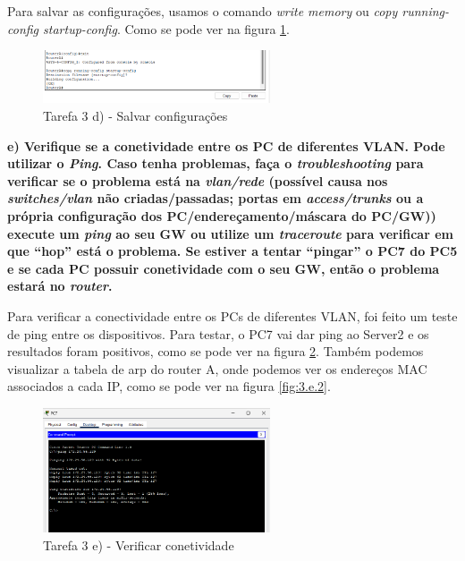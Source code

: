 \documentclass[11pt,english, openright, oneside]{book}
\begin{document}
Para salvar as configurações, usamos o comando \textit{write memory} ou \textit{copy running-config startup-config}. Como se pode ver na figura \ref{fig:3d}.
\vspace{0.2cm}

\begin{figure}[H]
    \centering
    \includegraphics[width=0.6\textwidth]{imagens/Tarefa3/3.d.png}
    \caption{Tarefa 3 d) - Salvar configurações}
    \label{fig:3d}
\end{figure}

\vspace{0.8cm}

\textbf{e) Verifique se a conetividade entre os PC de diferentes VLAN. Pode utilizar o \textit{Ping}. Caso tenha problemas, faça o \textit{troubleshooting} para verificar se o problema está na \textit{vlan/rede} (possível causa nos \textit{switches/vlan} não criadas/passadas; portas em \textit{access/trunks} ou a própria configuração dos PC/endereçamento/máscara do PC/GW)) execute um \textit{ping} ao seu GW ou utilize um \textit{traceroute} para verificar em que “hop” está o problema. Se estiver a tentar “pingar” o PC7 do PC5 e se cada PC possuir conetividade com o seu GW, então o problema estará no \textit{router}.}
\vspace{0.2cm}

Para verificar a conectividade entre os PCs de diferentes VLAN, foi feito um teste de ping entre os dispositivos. Para testar, o PC7 vai dar ping ao Server2 e os resultados foram positivos, como se pode ver na figura \ref{fig:3.e.1}. Também podemos visualizar a tabela de arp do router A, onde podemos ver os endereços MAC associados a cada IP, como se pode ver na figura \ref{fig:3.e.2}.
\vspace{0.2cm}

\begin{figure}[H]
    \centering
    \includegraphics[width=0.6\textwidth]{imagens/Tarefa3/3.e.1.png}
    \caption{Tarefa 3 e) - Verificar conetividade}
    \label{fig:3.e.1}
\end{figure}
\end{document}
